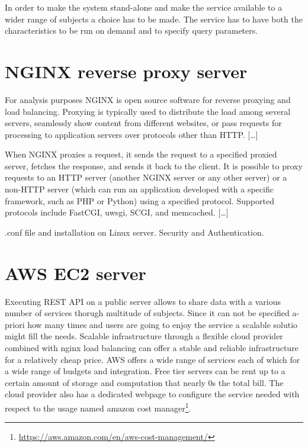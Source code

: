 \documentclass[
  12pt,
  a4paper,
  oneside]{book}
\DeclareRobustCommand{\href}[2]{#2\footnote{\url{#1}}}
\theoremstyle{definition}
\theoremstyle{definition}
\theoremstyle{definition}
\theoremstyle{remark}
\begin{document}
In order to make the system stand-alone and make the service available to a wider range of subjects a choice has to be made. The service has to have both the characteristics to be run on demand and to specify query parameters.

\hypertarget{nginx}{%
\section{NGINX reverse proxy server}\label{nginx}}

For analysis purposes NGINX is open source software for reverse proxying and load balancing.
Proxying is typically used to distribute the load among several servers, seamlessly show content from different websites, or pass requests for processing to application servers over protocols other than HTTP.
{[}\ldots{]}

When NGINX proxies a request, it sends the request to a specified proxied server, fetches the response, and sends it back to the client. It is possible to proxy requests to an HTTP server (another NGINX server or any other server) or a non-HTTP server (which can run an application developed with a specific framework, such as PHP or Python) using a specified protocol. Supported protocols include FastCGI, uwsgi, SCGI, and memcached.
{[}\ldots{]}

.conf file and installation on Linux server. Security and Authentication.

\hypertarget{aws}{%
\section{AWS EC2 server}\label{aws}}

Executing REST API on a public server allows to share data with a various number of services thorugh multitude of subjects. Since it can not be specified a-priori how many times and users are going to enjoy the service a scalable solutio might fill the needs. Scalable infrastructure through a flexible cloud provider combined with nginx load balancing can offer a stable and reliable infrastructure for a relatively cheap price.
AWS offers a wide range of services each of which for a wide range of budgets and integration. Free tier servers can be rent up to a certain amount of storage and computation that nearly 0s the total bill. The cloud provider also has a dedicated webpage to configure the service needed with respect to the usage named \href{https://aws.amazon.com/en/aws-cost-management/}{amazon cost manager}.
\end{document}
